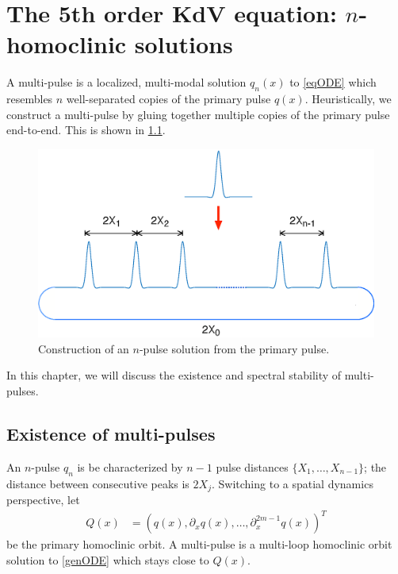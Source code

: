 \documentclass[thesis.tex]{subfiles}
\begin{document}
\iffulldocument\else
	\chapter{The 5th order KdV equation: $n$-homoclinic solutions}
\fi

A multi-pulse is a localized, multi-modal solution $q_n(x)$ to \cref{eqODE} which resembles $n$ well-separated copies of the primary pulse $q(x)$. Heuristically, we construct a multi-pulse by gluing together multiple copies of the primary pulse end-to-end. This is shown in \cref{fig:multipulse}.

\begin{figure}[H]
\includegraphics[width=12cm]{images/kdv5numerics/multipulseperiodic.eps}
\caption{Construction of an $n$-pulse solution from the primary pulse.}
\label{fig:multipulse}
\end{figure}

\noi In this chapter, we will discuss the existence and spectral stability of multi-pulses.

\section{Existence of multi-pulses}\label{sec:multiexistR}

An $n$-pulse $q_n$ is be characterized by $n-1$ pulse distances $\{ X_1, \dots, X_{n-1} \}$; the distance between consecutive peaks is $2 X_j$. Switching to a spatial dynamics perspective, let
\begin{align*}
Q(x) &= (q(x), \partial_x q(x), \dots, \partial_x^{2m-1}q(x))^T
\end{align*}
be the primary homoclinic orbit. A multi-pulse is a multi-loop homoclinic orbit solution to \eqref{genODE} which stays close to $Q(x)$.  
\end{document}
